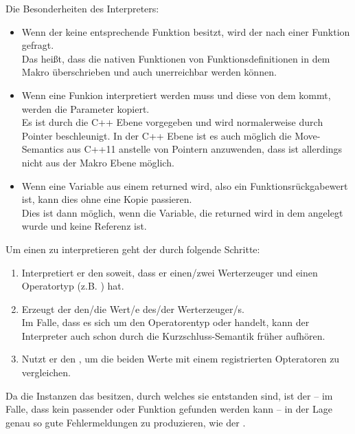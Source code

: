 {      Die Besonderheiten des Interpreters:
      \begin{itemize}
        \item Wenn der  keine entsprechende Funktion besitzt, wird der  nach einer Funktion gefragt.\\
          Das heißt, dass die nativen Funktionen von Funktionsdefinitionen in dem Makro überschrieben und auch unerreichbar werden können.
        \item Wenn eine Funkion interpretiert werden muss und diese von dem  kommt, werden die Parameter kopiert.\\
          Es ist durch die C++ Ebene vorgegeben und wird normalerweise durch Pointer beschleunigt. In der C++ Ebene ist es auch möglich die Move-Semantics\autocite[S.268 ff.]{C++14-std} aus C++11 anstelle von Pointern anzuwenden, dass ist allerdings nicht aus der Makro Ebene möglich.
        \item Wenn eine Variable aus einem  returned wird, also ein Funktionsrückgabewert ist, kann dies ohne eine Kopie passieren.\\
          Dies ist dann möglich, wenn die Variable, die returned wird in dem  angelegt wurde und keine Referenz ist.
      \end{itemize}

      Um einen  zu interpretieren geht der  durch folgende Schritte:
      \begin{enumerate}
        \item Interpretiert er den   soweit, dass er einen/zwei Werterzeuger und einen Operatortyp (z.B. \myMinin{==}) hat.
        \item Erzeugt der  den/die Wert/e des/der Werterzeuger/s.\\
          Im Falle, dass es sich um den Operatorentyp \myMinin{&&} oder \myMinin{||} handelt, kann der Interpreter auch schon durch die Kurzschluss-Semantik früher aufhören.
        \item Nutzt er den , um die beiden Werte mit einem registrierten Opteratoren zu vergleichen.
      \end{enumerate}

      Da die  Instanzen das  besitzen, durch welches sie entstanden sind, ist der  -- im Falle, dass kein passender  oder Funktion gefunden werden kann -- in der Lage genau so gute Fehlermeldungen zu produzieren, wie der .

}
